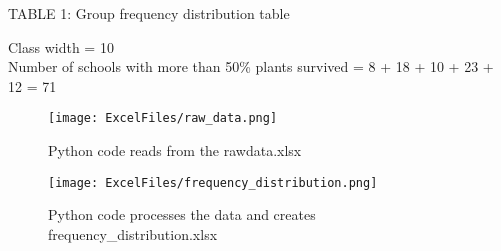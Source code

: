 \documentclass[journal,12pt,twocolumn]{IEEEtran}
\theoremstyle{remark}
\begin{document}
\begin{center}
TABLE 1: Group frequency distribution table
\end{center}
Class width = 10\\
Number of schools with more than 50\% plants survived = 8 + 18 + 10 + 23 + 12 = 71

\begin{figure}[H]
    \centering
    \texttt{[image: ExcelFiles/raw\_data.png]}
    \caption{Python code reads from the rawdata.xlsx}
    \label{fig1}
\end{figure}
\begin{figure}[H]
    \centering
    \texttt{[image: ExcelFiles/frequency\_distribution.png]}
    \caption{Python code processes the data and creates frequency\_distribution.xlsx}
    \label{fig2}
\end{figure}
\end{document}
